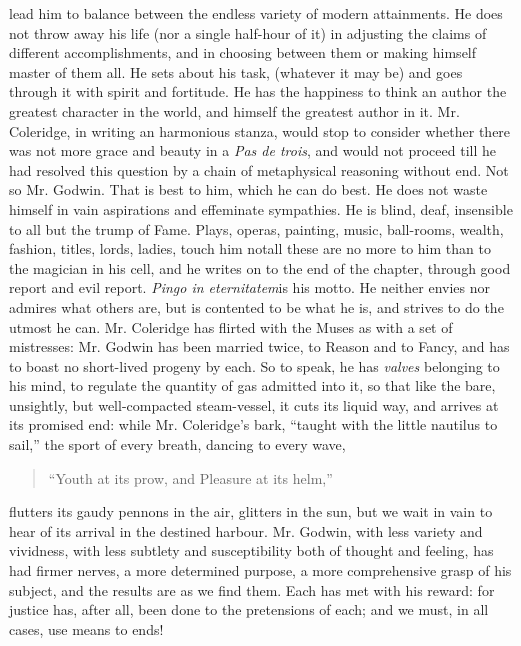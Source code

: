 lead him to balance between the endless variety of modern
attainments. He does not throw away his life (nor a single
half-hour of it) in adjusting the claims of different
accomplishments, and in choosing between them or making himself
master of them all. He sets about his task, (whatever it may be)
and goes through it with spirit and fortitude. He has the
happiness to think an author the greatest character in the world,
and himself the greatest author in it. Mr. Coleridge, in writing
an harmonious stanza, would stop to consider whether there was not
more grace and beauty in a \emph{Pas de trois}, and would not
proceed till he had resolved this question by a chain of
metaphysical reasoning without end.  Not so Mr. Godwin. That is
best to him, which he can do best. He does not waste himself in
vain aspirations and effeminate sympathies. He is blind, deaf,
insensible to all but the trump of Fame. Plays, operas, painting,
music, ball-rooms, wealth, fashion, titles, lords, ladies, touch
him not\textemdash all these are no more to him than to the
magician in his cell, and he writes on to the end of the chapter,
through good report and evil report. \emph{Pingo in
eternitatem}\textemdash is his motto. He neither envies nor
admires what others are, but is contented to be what he is, and
strives to do the utmost he can. Mr. Coleridge has flirted with
the Muses as with a set of mistresses: Mr. Godwin has been married
twice, to Reason and to Fancy, and has to boast no short-lived
progeny by each.  So to speak, he has \emph{valves} belonging to
his mind, to regulate the quantity of gas admitted into it, so
that like the bare, unsightly, but well-compacted steam-vessel, it
cuts its liquid way, and arrives at its promised end: while
Mr. Coleridge's bark, ``taught with the little nautilus to sail,''
the sport of every breath, dancing to every wave,
\begin{quote} ``Youth at its prow, and Pleasure at its helm,''
\end{quote} flutters its gaudy pennons in the air, glitters in the
sun, but we wait in vain to hear of its arrival in the destined
harbour. Mr. Godwin, with less variety and vividness, with less
subtlety and susceptibility both of thought and feeling, has had
firmer nerves, a more determined purpose, a more comprehensive
grasp of his subject, and the results are as we find them. Each
has met with his reward: for justice has, after all, been done to
the pretensions of each; and we must, in all cases, use means to
ends!

